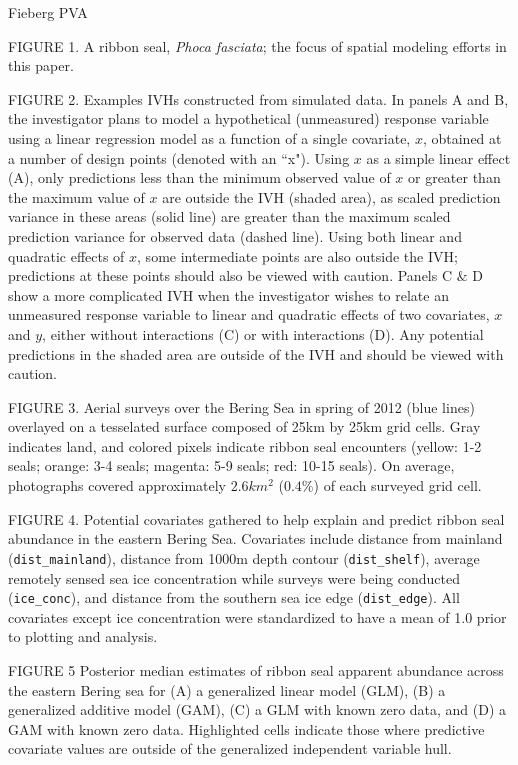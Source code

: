 \documentclass[12pt,english]{article}
\begin{document}
\begin{spacing}{1.9}
Fieberg PVA




FIGURE 1. A ribbon seal, {\it Phoca fasciata}; the focus of spatial modeling efforts in this paper.

FIGURE 2. Examples IVHs constructed from simulated data.  In panels A and B, the investigator plans to model a hypothetical (unmeasured) response variable using a linear regression model as a function of a single covariate, $x$, obtained at a number of design points (denoted with an ``x").  Using $x$ as a simple linear effect (A), only predictions less than the minimum observed value of $x$ or greater than the maximum value of $x$ are outside the IVH (shaded area), as scaled prediction variance in these areas (solid line) are greater than the maximum scaled prediction variance for observed data (dashed line).  Using both linear and quadratic effects of $x$, some intermediate points are also outside the IVH; predictions at these points should also be viewed with caution.  Panels C $\&$ D show a more complicated IVH when the investigator wishes to relate an unmeasured response variable to linear and quadratic effects of two covariates, $x$ and $y$, either without interactions (C) or with interactions (D).  Any potential predictions in the shaded area are outside of the IVH and should be viewed with caution.

FIGURE 3. Aerial surveys over the Bering Sea in spring of 2012 (blue lines) overlayed on
a tesselated surface composed of 25km by 25km grid cells.  Gray indicates land, and colored pixels indicate ribbon seal encounters (yellow: 1-2 seals; orange: 3-4 seals; magenta: 5-9 seals; red: 10-15 seals).  On average, photographs covered approximately $2.6km^2$ ($0.4\%$) of each surveyed grid cell.

FIGURE 4. Potential covariates gathered to help explain and predict ribbon seal abundance in the eastern Bering Sea.  Covariates include distance from mainland (\texttt{dist\_mainland}), distance from 1000m depth contour (\texttt{dist\_shelf}), average remotely sensed sea ice concentration while surveys were being conducted (\texttt{ice\_conc}), and distance from the southern sea ice edge (\texttt{dist\_edge}).  All covariates except ice concentration were standardized to have a mean of 1.0 prior to plotting and analysis.

FIGURE 5  Posterior median estimates of ribbon seal apparent abundance across the eastern Bering sea for (A) a generalized linear model (GLM), (B) a generalized additive model (GAM), (C) a GLM with known zero data, and (D) a GAM with known zero data.  Highlighted cells indicate those where predictive covariate values are outside of the generalized independent variable hull.


\end{spacing}
\end{document}
